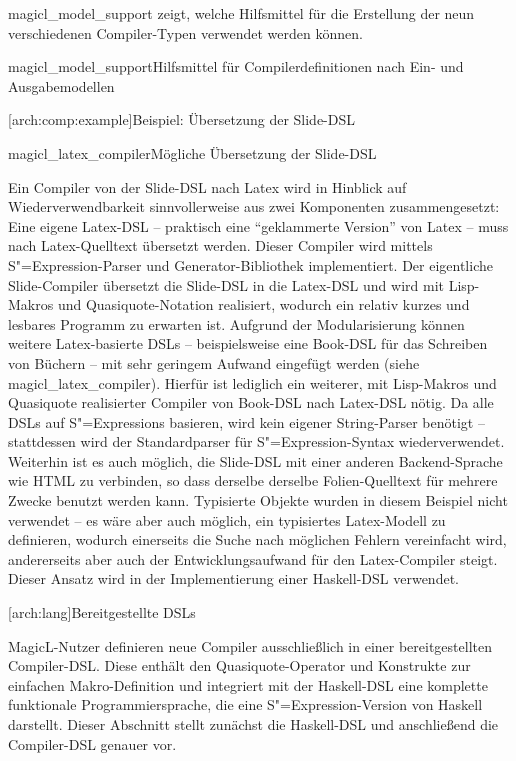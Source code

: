 \documentclass[12pt, a4paper, bibgerm]{scrbook}
\newcommand\lsection{}
\newcommand\lsubsubsection{}
\newcommand\abb{}
\newcommand\fig{}
\newcommand{\seea}[1]{(siehe \abb{#1})}
\newcommand{\sexp}{S"=Expression}
\newcommand{\sexps}{S"=Expressions}
\begin{document}
\medskip{}

\abb{magicl_model_support} zeigt, welche Hilfsmittel für die Erstellung
der neun verschiedenen Compiler-Typen verwendet werden können.

\fig{magicl_model_support}{Hilfsmittel für Compilerdefinitionen nach
  Ein- und Ausgabemodellen}

\lsubsubsection[arch:comp:example]{Beispiel: Übersetzung der Slide-DSL}

\fig{magicl_latex_compiler}{Mögliche Übersetzung der Slide-DSL}

Ein Compiler von der Slide-DSL nach Latex wird in Hinblick auf
Wiederverwendbarkeit sinnvollerweise aus zwei Komponenten
zusammengesetzt: Eine eigene Latex-DSL -- praktisch eine ``geklammerte
Version'' von Latex -- muss nach Latex-Quelltext übersetzt werden.
Dieser Compiler wird mittels \sexp{}-Parser und Generator-Bibliothek
implementiert. Der eigentliche Slide-Compiler übersetzt die Slide-DSL in
die Latex-DSL und wird mit Lisp-Makros und Quasiquote-Notation
realisiert, wodurch ein relativ kurzes und lesbares Programm zu erwarten
ist. Aufgrund der Modularisierung können weitere Latex-basierte DSLs --
beispielsweise eine Book-DSL für das Schreiben von Büchern -- mit sehr
geringem Aufwand eingefügt werden \seea{magicl_latex_compiler}. Hierfür
ist lediglich ein weiterer, mit Lisp-Makros und Quasiquote realisierter
Compiler von Book-DSL nach Latex-DSL nötig. Da alle DSLs auf \sexps{}
basieren, wird kein eigener String-Parser benötigt -- stattdessen wird
der Standardparser für \sexp{}-Syntax wiederverwendet. Weiterhin ist es
auch möglich, die Slide-DSL mit einer anderen Backend-Sprache wie HTML
zu verbinden, so dass derselbe derselbe Folien-Quelltext für mehrere
Zwecke benutzt werden kann. Typisierte Objekte wurden in diesem Beispiel
nicht verwendet -- es wäre aber auch möglich, ein typisiertes
Latex-Modell zu definieren, wodurch einerseits die Suche nach möglichen Fehlern
vereinfacht wird, andererseits aber auch der Entwicklungsaufwand für den
Latex-Compiler steigt. Dieser Ansatz wird in der Implementierung
einer Haskell-DSL verwendet.

\lsection[arch:lang]{Bereitgestellte DSLs}

MagicL-Nutzer definieren neue Compiler ausschließlich in einer
bereitgestellten Compiler-DSL. Diese enthält den Quasiquote-Operator und
Konstrukte zur einfachen Makro-Definition und integriert mit der
Haskell-DSL eine komplette funktionale Programmiersprache, die eine
\sexp{}-Version von Haskell darstellt. Dieser Abschnitt stellt zunächst
die Haskell-DSL und anschließend die Compiler-DSL genauer vor.
\end{document}
